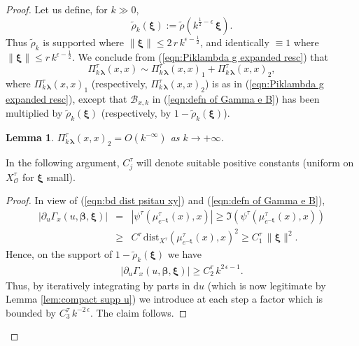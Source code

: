 \documentclass[12pt,a4paper]{article}
\theoremstyle{plain}
\newtheorem{lem}[thm]{Lemma}%
\theoremstyle{definition}
\begin{document}
\begin{proof}
Let us define, for $k\gg 0$,
\begin{equation}
\label{eqn:cut-off rescaled}
\tilde{\rho}_k(\boldsymbol{\xi}):=
\tilde{\rho}\left(k^{\frac{1}{2}-\epsilon}\,\boldsymbol{\xi}\right).
\end{equation}
%
Thus $\tilde{\rho}_k$ is supported where 
$\|\boldsymbol{\xi}\|\le 2\,r\,k^{\epsilon-\frac{1}{2}}$,
and identically $\equiv 1$ where $\|\boldsymbol{\xi}\|\le 
r\,k^{\epsilon-\frac{1}{2}}$.
We conclude from (\ref{eqn:Piklambda g expanded resc}) that
$$
\Pi^\tau_{k\,\boldsymbol{\lambda}}(x,x)\sim 
\Pi^\tau_{k\,\boldsymbol{\lambda}}(x,x)_1+
\Pi^\tau_{k\,\boldsymbol{\lambda}}(x,x)_2,
$$
where $\Pi^\tau_{k\,\boldsymbol{\lambda}}(x,x)_1$ (respectively,
$\Pi^\tau_{k\,\boldsymbol{\lambda}}(x,x)_2$) is as in  
(\ref{eqn:Piklambda g expanded resc}), except that $\mathcal{B}_{x,k}$ in 
(\ref{eqn:defn of Gamma e B}) has been multiplied by $\tilde{\rho}_k(\boldsymbol{\xi})$
(respectively, by $1-\tilde{\rho}_k(\boldsymbol{\xi})$).

\begin{lem}
$\Pi^\tau_{k\,\boldsymbol{\lambda}}(x,x)_2=O\left(k^{-\infty}\right)$
as $k\rightarrow+\infty$.
\end{lem}
%
In the following argument, $C^\tau_j$ will denote suitable positive constants (uniform on $X^\tau_{\mathcal{O}}$ for $\boldsymbol{\xi}$ small).
%
\begin{proof}
In view of (\ref{eqn:bd dist psitau xy}) and 
 (\ref{eqn:defn of Gamma e B}),
\begin{eqnarray*}
\left|\partial_u\Gamma_x(u,\boldsymbol{\beta},\boldsymbol{\xi})\right|&=&
\left|\psi^\tau\left(\mu^\tau_{e^{-\boldsymbol{\xi}}}(x),x   \right)\right|
\ge \Im\left( \psi^\tau\left(\mu^\tau_{e^{-\boldsymbol{\xi}}}(x),x   \right)  \right)\\
&\ge &C^\tau\,\mathrm{dist}_{X^\tau}\left(\mu^\tau_{e^{-\boldsymbol{\xi}}}(x),x   \right) ^2\ge C_1^\tau\,\|\boldsymbol{\xi}\|^2.
\nonumber
\end{eqnarray*}
Hence, on the support of $1-\tilde{\rho}_k(\boldsymbol{\xi})$ we have
\begin{eqnarray}
\left|\partial_u\Gamma_x(u,\boldsymbol{\beta},\boldsymbol{\xi})\right|
\ge C_2^\tau\,k^{2\,\epsilon-1}.
\nonumber
\end{eqnarray}
Thus, by iteratively integrating by parts in $\mathrm{d}u$ 
(which is now legitimate by Lemma \ref{lem:compact supp u})
we introduce at each step a 
factor which is bounded by $C_3^\tau\,k^{-2\,\epsilon}$.
The claim follows.


\end{proof}
\end{proof}
\end{document}
